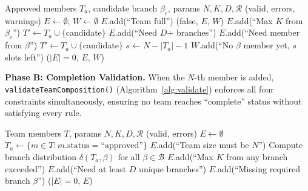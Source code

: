 \documentclass[conference]{IEEEtran}
\begin{document}
\begin{algorithm}[htbp]
\caption{Pre-Addition Constraint Validation (\texttt{canAddMember})}
\label{alg:canAdd}
\footnotesize
\begin{algorithmic}[1]
\REQUIRE Approved members $T_a$, candidate branch $\beta_c$, params $N, K, D, \mathcal{R}$
\ENSURE (valid, errors, warnings)
\STATE $E \gets \emptyset$; $W \gets \emptyset$
    \STATE $E$.add(``Team full'')
    \RETURN (false, $E$, $W$)
\ENDIF
{}
    \STATE $E$.add(``Max $K$ from $\beta_c$'')
\ENDIF
{}
    \STATE $T' \gets T_a \cup \{$candidate$\}$
        \STATE $E$.add(``Need $D$+ branches'')
    \ENDIF
            \STATE $E$.add(``Need member from $\beta$'')
        \ENDIF
    \ENDFOR
{}
    \STATE $T' \gets T_a \cup \{$candidate$\}$
            \STATE $s \gets N - |T_a| - 1$
            \STATE $W$.add(``No $\beta$ member yet, $s$ slots left'')
        \ENDIF
    \ENDFOR
\ENDIF
\RETURN ($|E| = 0$, $E$, $W$)
\end{algorithmic}
\end{algorithm}

\textbf{Phase B: Completion Validation.} When the $N$-th member is added, \texttt{validateTeamComposition()} (Algorithm~\ref{alg:validate}) enforces all four constraints simultaneously, ensuring no team reaches ``complete'' status without satisfying every rule.

\begin{algorithm}[htbp]
\caption{Full Team Composition Validation}
\label{alg:validate}
\footnotesize
\begin{algorithmic}[1]
\REQUIRE Team members $T$, params $N, K, D, \mathcal{R}$
\ENSURE (valid, errors)
\STATE $E \gets \emptyset$
\STATE $T_a \gets \{m \in T : m.\text{status} = \text{``approved''}\}$
    \STATE $E$.add(``Team size must be $N$'')
\ENDIF
\STATE Compute branch distribution $\delta(T_a, \beta)$ for all $\beta \in \mathcal{B}$
    \STATE $E$.add(``Max $K$ from any branch exceeded'')
\ENDIF
{}
    \STATE $E$.add(``Need at least $D$ unique branches'')
\ENDIF
{}
        \STATE $E$.add(``Missing required branch $\beta$'')
    \ENDIF
\ENDFOR
\RETURN ($|E| = 0$, $E$)
\end{algorithmic}
\end{algorithm}
\end{document}
